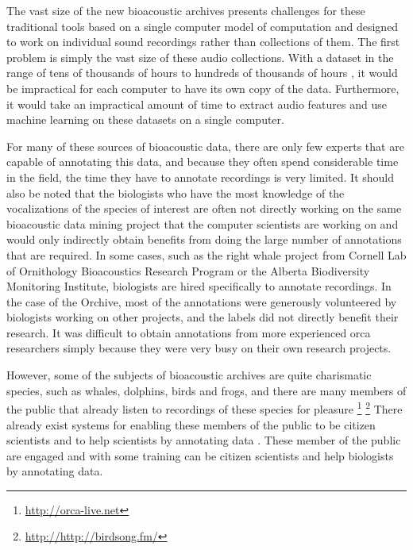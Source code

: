 The vast size of the new bioacoustic archives presents challenges for
these traditional tools based on a single computer model of
computation and designed to work on individual sound recordings rather
than collections of them. The first problem is simply the vast size of
these audio collections.  With a dataset in the range of tens of
thousands of hours \cite{ness2013orchive} to hundreds of thousands of
hours \cite{urazghildiiev2009rightwhale}, it would be impractical for
each computer to have its own copy of the data.  Furthermore, it would
take an impractical amount of time to extract audio features and use
machine learning on these datasets on a single computer.

For many of these sources of bioacoustic data, there are only few
experts that are capable of annotating this data, and because they
often spend considerable time in the field, the time they have to
annotate recordings is very limited.  It should also be noted that the
biologists who have the most knowledge of the vocalizations of the
species of interest are often not directly working on the same
bioacoustic data mining project that the computer scientists are
working on and would only indirectly obtain benefits from doing the
large number of annotations that are required.  In some cases, such as
the right whale project from Cornell Lab of Ornithology Bioacoustics
Research Program or the Alberta Biodiversity Monitoring Institute,
biologists are hired specifically to annotate recordings.  In the case
of the Orchive, most of the annotations were generously volunteered by
biologists working on other projects, and the labels did not directly
benefit their research.  It was difficult to obtain annotations from
more experienced orca researchers simply because they were very busy
on their own research projects.

However, some of the subjects of bioacoustic archives are quite
charismatic species, such as whales, dolphins, birds and frogs, and
there are many members of the public that already listen to recordings
of these species for pleasure \footnote{\url{http://orca-live.net}}
\footnote{\url{http://http://birdsong.fm/}} There already exist
systems for enabling these members of the public to be citizen
scientists \cite{anze08galaxyzoo} and to help scientists by annotating
data \cite{taylor2009neptune}.  These member of the public are engaged
and with some training can be citizen scientists and help biologists
by annotating data.

